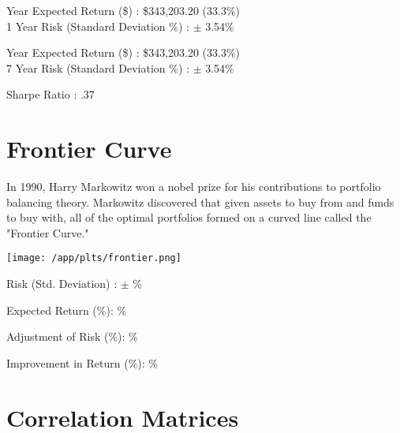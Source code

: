 \documentclass{article}
\begin{document}
 Year Expected Return (\$) : \$343,203.20 (33.3\%)\\
1 Year Risk (Standard Deviation \%) : $\pm$ 3.54\%

 Year Expected Return (\$) : \$343,203.20 (33.3\%)\\
7 Year Risk (Standard Deviation \%) : $\pm$ 3.54\%

\noindent
Sharpe Ratio : .37


\newpage    %



\section{Frontier Curve}

In 1990, Harry Markowitz won a nobel prize for his contributions to portfolio balancing theory. Markowitz discovered that given assets to buy from and funds to buy with, all of the optimal portfolios formed on a curved line called the "Frontier Curve."

\vspace{2cm}

\hspace*{-2.5cm}\texttt{[image: /app/plts/frontier.png]}\par

\vspace{1cm}


Risk (Std. Deviation) : $\pm$ {} \%

Expected Return (\%): {} \%

Adjustment of Risk (\%): {} \%

Improvement in Return (\%): {} \%


\newpage    %

\section{Correlation Matrices}

\vspace{1cm}
\end{document}
